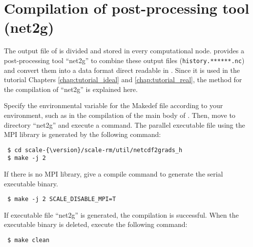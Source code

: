 \section{Compilation of post-processing tool (net2g)} \label{sec:source_net2g}

The output file of \scalerm is divided and stored in every computational node.
\scalelib provides a post-processing tool ``net2g''  to combine these output files
(\verb|history.******.nc|)
and convert them into a data format direct readable in \grads.
Since it is used in the tutorial Chapters \ref{chap:tutorial_ideal} and \ref{chap:tutorial_real}, the method for the compilation of ``net2g'' is explained here.

Specify the environmental variable for the Makedef file according to your environment,
such as in the compilation of the main body of \scalelib. Then, move to directory  ``net2g'' and execute a command. The parallel executable file using the MPI library is generated by the following command:
\begin{verbatim}
 $ cd scale-{\version}/scale-rm/util/netcdf2grads_h
 $ make -j 2
\end{verbatim}
If there is no MPI library,
give a compile command to generate the serial executable binary.
\begin{verbatim}
 $ make -j 2 SCALE_DISABLE_MPI=T
\end{verbatim}
If executable file ``net2g'' is generated, the compilation is successful.
When the executable binary is deleted, execute the following command:
\begin{verbatim}
 $ make clean
\end{verbatim}


